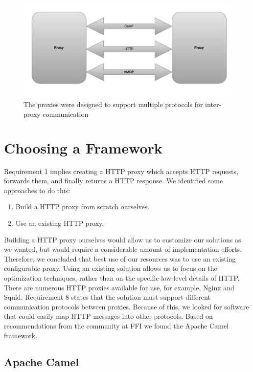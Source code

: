 \begin{figure}[h]
\includegraphics[width=\textwidth]{images/proxy_communication.png}
\caption{The proxies were designed to support multiple protocols for inter-proxy communication}
\label{figure:proxy-communication}
\end{figure}


\section{Choosing a Framework}

Requirement 1 implies creating a HTTP proxy which accepts HTTP requests,
forwards them, and finally returns a HTTP response. We identified some
approaches to do this:

\begin{enumerate}
    \item Build a HTTP proxy from scratch ourselves.
    \item Use an existing HTTP proxy.
\end{enumerate}

Building a HTTP proxy ourselves would allow us to customize our solutions as we
wanted, but would require a considerable amount of implementation efforts.
Therefore, we concluded that best use of our resources was to use an existing
configurable proxy. Using an existing solution allows us to focus on the
optimization techniques, rather than on the specific low-level details of HTTP.
There are numerous HTTP proxies available for use, for example,
Nginx\cite{nginx-homepage} and Squid\cite{squid-homepage}. Requirement 8 states
that the solution must support different communication protocols between
proxies. Because of this, we looked for software that could easily map HTTP
messages into other protocols. Based on recommendations from the community at FFI
we found the Apache Camel framework.

\subsection{Apache Camel}

